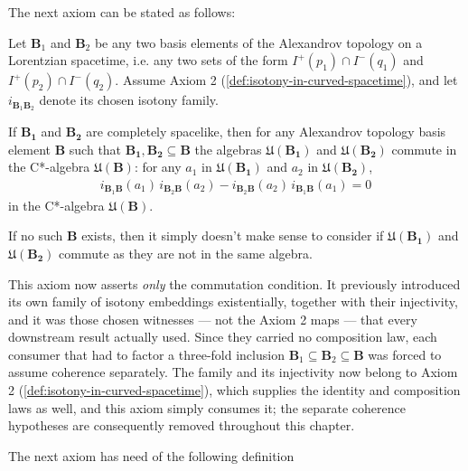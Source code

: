 The next axiom can be stated as follows:

\begin{definition}
    \label{def:local-commutativity-in-curved-spacetime}
    \leanok
    Let $\mathbf{B}_1$ and $\mathbf{B}_2$ be any two basis elements of the Alexandrov topology on a Lorentzian spacetime, i.e. any two sets of the form $I^+(p_1) \cap I^-(q_1)$ and $I^+(p_2) \cap I^-(q_2)$. Assume Axiom 2 (\ref{def:isotony-in-curved-spacetime}), and let $i_{\mathbf{B}_1\mathbf{B}_2}$ denote its chosen isotony family.

    If $\mathbf{B_1}$ and $\mathbf{B_2}$ are completely spacelike, then for any Alexandrov topology basis element $\mathbf{B}$ such that $\mathbf{B_1}, \mathbf{B_2} \subseteq \mathbf{B}$ the algebras $\mathfrak{U}(\mathbf{B_1})$ and $\mathfrak{U}(\mathbf{B_2})$ commute in the C*-algebra $\mathfrak{U}(\mathbf{B})$: for any $a_1$ in $\mathfrak{U}(\mathbf{B_1})$ and $a_2$ in $\mathfrak{U}(\mathbf{B_2})$,
    \begin{align}
        i_{\mathbf{B}_1\mathbf{B}}(a_1)\, i_{\mathbf{B}_2\mathbf{B}}(a_2) - i_{\mathbf{B}_2\mathbf{B}}(a_2)\, i_{\mathbf{B}_1\mathbf{B}}(a_1) = 0
    \end{align}
    in the C*-algebra $\mathfrak{U}(\mathbf{B})$.

    If no such $\mathbf{B}$ exists, then it simply doesn't make sense to consider if $\mathfrak{U}(\mathbf{B_1})$ and $\mathfrak{U}(\mathbf{B_2})$ commute as they are not in the same algebra.

    This axiom now asserts \emph{only} the commutation condition. It previously introduced its own family of isotony embeddings existentially, together with their injectivity, and it was those chosen witnesses --- not the Axiom 2 maps --- that every downstream result actually used. Since they carried no composition law, each consumer that had to factor a three-fold inclusion $\mathbf{B}_1 \subseteq \mathbf{B}_2 \subseteq \mathbf{B}$ was forced to assume coherence separately. The family and its injectivity now belong to Axiom 2 (\ref{def:isotony-in-curved-spacetime}), which supplies the identity and composition laws as well, and this axiom simply consumes it; the separate coherence hypotheses are consequently removed throughout this chapter.
\end{definition}

The next axiom has need of the following definition

